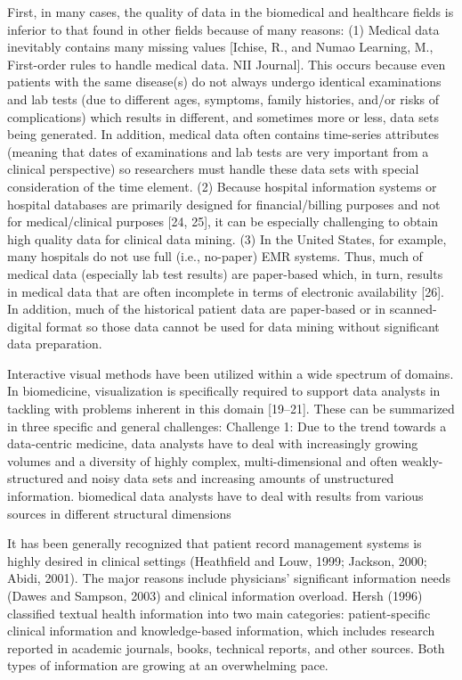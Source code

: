 \documentclass[10pt,a4paper]{article}
\begin{document}
	First, in many cases, the quality of data in the biomedical and healthcare fields is inferior to that found in other fields because of many reasons: (1) Medical data inevitably contains many missing values [Ichise, R., and Numao Learning, M., First-order rules to handle medical data. NII Journal]. This occurs because even patients with the same disease(s) do not always undergo identical examinations and lab tests (due to different ages, symptoms, family histories, and/or risks of complications) which results in different, and sometimes more or less, data sets being generated. In addition, medical data often contains time-series attributes (meaning that dates of examinations and lab tests are very important from a clinical perspective) so researchers must handle these data sets with special consideration of the time element. (2) Because hospital information systems or hospital databases are primarily designed for financial/billing purposes and not for medical/clinical purposes [24, 25], it can be especially challenging to obtain high quality data for clinical data mining. (3) In the United States, for example, many hospitals do not use full (i.e., no-paper) EMR systems. Thus, much of medical data (especially lab test results) are paper-based which, in turn, results in medical data that are often incomplete in terms of electronic availability [26]. In addition, much of the historical patient data are paper-based or in scanned-digital format so those data cannot be used for data mining without significant data preparation. \cite{Yoo2012}
	
	Interactive visual methods have been utilized within a wide spectrum of domains.
	In biomedicine, visualization is specifically required to support data analysts in
	tackling with problems inherent in this domain [19–21]. These can be summarized
	in three specific and general challenges:
	Challenge 1: Due to the trend towards a data-centric medicine, data analysts
	have to deal with increasingly growing volumes and a diversity of highly complex,
	multi-dimensional and often weakly-structured and noisy data sets and
	increasing amounts of unstructured information. biomedical data analysts have to deal with results from various sources in different
	structural dimensions \cite{Turkay2014}
	
	It has been generally recognized that patient record management systems
	is highly desired in clinical settings (Heathfield and Louw, 1999; Jackson,
	2000; Abidi, 2001). The major reasons include physicians' significant
	information needs (Dawes and Sampson, 2003) and clinical information
	overload. Hersh (1996) classified textual health information into two main
	categories: patient-specific clinical information and knowledge-based
	information, which includes research reported in academic journals, books,
	technical reports, and other sources. Both types of information are growing
	at an overwhelming pace. \cite{chen2006medical}
	
\end{document}
